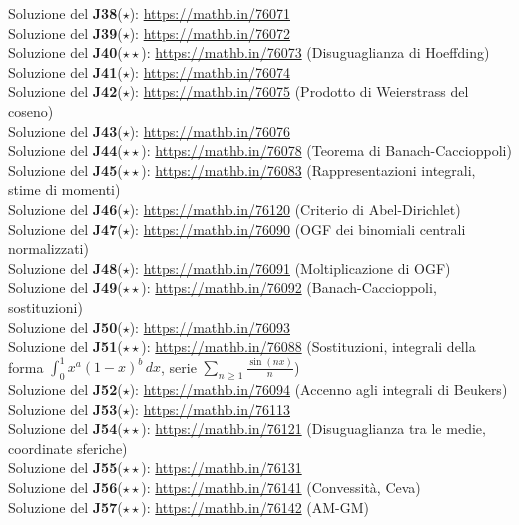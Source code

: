 \documentclass[a4paper,twoside]{article}
\theoremstyle{definition}
\numberwithin{theorem}{section}
\begin{document}
Soluzione del \textbf{J38}($\star$): \url{https://mathb.in/76071}\\
Soluzione del \textbf{J39}($\star$): \url{https://mathb.in/76072}\\
Soluzione del \textbf{J40}($\star\star$): \url{https://mathb.in/76073} (Disuguaglianza di Hoeffding)\\
Soluzione del \textbf{J41}($\star$): \url{https://mathb.in/76074}\\
Soluzione del \textbf{J42}($\star$): \url{https://mathb.in/76075} (Prodotto di Weierstrass del coseno)\\
Soluzione del \textbf{J43}($\star$): \url{https://mathb.in/76076}\\
Soluzione del \textbf{J44}($\star\star$): \url{https://mathb.in/76078} (Teorema di Banach-Caccioppoli)\\
Soluzione del \textbf{J45}($\star\star$): \url{https://mathb.in/76083} (Rappresentazioni integrali, stime di momenti)\\
Soluzione del \textbf{J46}($\star$): \url{https://mathb.in/76120} (Criterio di Abel-Dirichlet)\\
Soluzione del \textbf{J47}($\star$): \url{https://mathb.in/76090} (OGF dei binomiali centrali normalizzati)\\
Soluzione del \textbf{J48}($\star$): \url{https://mathb.in/76091} (Moltiplicazione di OGF)\\
Soluzione del \textbf{J49}($\star\star$): \url{https://mathb.in/76092} (Banach-Caccioppoli, sostituzioni) \\
Soluzione del \textbf{J50}($\star$): \url{https://mathb.in/76093} \\
Soluzione del \textbf{J51}($\star\star$): \url{https://mathb.in/76088} (Sostituzioni, integrali della forma $\int_{0}^{1}x^a(1-x)^b\,dx$, serie $\sum_{n\geq 1}\frac{\sin(nx)}{n}$)\\
Soluzione del \textbf{J52}($\star$): \url{https://mathb.in/76094} (Accenno agli integrali di Beukers)\\
Soluzione del \textbf{J53}($\star$): \url{https://mathb.in/76113} \\
Soluzione del \textbf{J54}($\star\star$): \url{https://mathb.in/76121} (Disuguaglianza tra le medie, coordinate sferiche)\\
Soluzione del \textbf{J55}($\star\star$): \url{https://mathb.in/76131} \\
Soluzione del \textbf{J56}($\star\star$): \url{https://mathb.in/76141}  (Convessità, Ceva)\\
Soluzione del \textbf{J57}($\star\star$): \url{https://mathb.in/76142}  (AM-GM)\\
\end{document}
